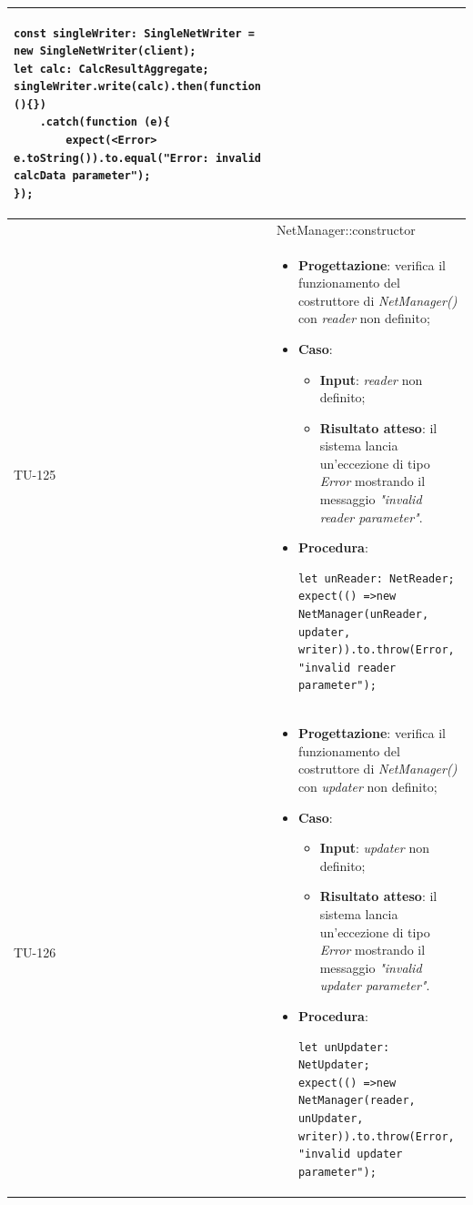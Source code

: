 \begin{longtable}{|C{1.5cm}|C{14.5cm}|}
\begin{itemize}
\begin{lstlisting}
const singleWriter: SingleNetWriter = new SingleNetWriter(client);
let calc: CalcResultAggregate;
singleWriter.write(calc).then(function (){})
	.catch(function (e){
		expect(<Error> e.toString()).to.equal("Error: invalid calcData parameter");
});
	\end{lstlisting}
\end{itemize}\\
\hline
{} & NetManager::constructor
\\ \hline
{TU-125} &
\begin{itemize}
	\item \textbf{Progettazione}: verifica il funzionamento del costruttore di \emph{NetManager()} con \emph{reader} non definito;
	\item \textbf{Caso}: 
	\begin{itemize}
		\item \textbf{Input}: \emph{reader} non definito;
		\item \textbf{Risultato atteso}: il sistema lancia un'eccezione di tipo \emph{Error} mostrando il messaggio \emph{"invalid reader parameter"}.
	\end{itemize}
	\item \textbf{Procedura}:
	\begin{lstlisting}
let unReader: NetReader;
expect(() =>new NetManager(unReader, updater, writer)).to.throw(Error, "invalid reader parameter");
	\end{lstlisting}
\end{itemize}\\
\hline
{TU-126} &
\begin{itemize}
	\item \textbf{Progettazione}: verifica il funzionamento del costruttore di \emph{NetManager()} con \emph{updater} non definito;
	\item \textbf{Caso}: 
	\begin{itemize}
		\item \textbf{Input}: \emph{updater} non definito;
		\item \textbf{Risultato atteso}: il sistema lancia un'eccezione di tipo \emph{Error} mostrando il messaggio \emph{"invalid updater parameter"}.
	\end{itemize}
	\item \textbf{Procedura}:
	\begin{lstlisting}
let unUpdater: NetUpdater;
expect(() =>new NetManager(reader, unUpdater, writer)).to.throw(Error, "invalid updater parameter");
	\end{lstlisting}

\end{itemize}
\end{longtable}
